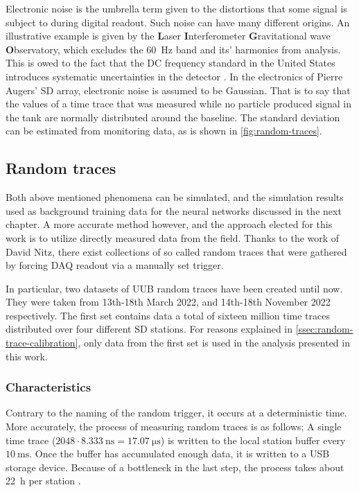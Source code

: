 Electronic noise is the umbrella term given to the distortions that some signal is subject to during digital readout. Such noise can have many different origins.
An illustrative example is given by the \textbf{L}aser \textbf{I}nterferometer \textbf{G}ravitational wave \textbf{O}bservatory, which excludes the \SI{60}{\hertz}
band and its' harmonics from analysis. This is owed to the fact that the DC frequency standard in the United States introduces systematic uncertainties in the
detector \cite{martynov2016sensitivity}. In the electronics of Pierre Augers' SD array, electronic noise is assumed to be Gaussian. That is to say that the 
\SI{}{\ADC} values of a time trace that was measured while no particle produced signal in the tank are normally distributed around the baseline. The standard 
deviation can be estimated from monitoring data, as is shown in \autoref{fig:random-traces}.

\subsection{Random traces}
\label{ssec:random-traces}

Both above mentioned phenomena can be simulated, and the simulation results used as background training data for the neural networks discussed in the next chapter.
A more accurate method however, and the approach elected for this work is to utilize directly measured data from the field. Thanks to the work of David Nitz, there 
exist collections of so called random traces that were gathered by forcing DAQ readout via a manually set trigger. 

In particular, two datasets of UUB random traces have been created until now. They were taken from 13th-18th March 2022, and 14th-18th November 2022 respectively. 
The first set contains data a total of sixteen million time traces distributed over four different SD stations. For reasons explained in 
\autoref{ssec:random-trace-calibration}, only data from the first set is used in the analysis presented in this work.

\subsubsection{Characteristics}
\label{ssec:random-trace-characteristics}

Contrary to the naming of the random trigger, it occurs at a deterministic time. More accurately, the process of measuring random traces is as follows;
A single time trace ($2048\cdot\SI{8.333}{\nano\second} = \SI{17.07}{\micro\second}$) is written to the local station buffer every $\SI{10}{\milli\second}$. Once
the buffer has accumulated enough data, it is written to a USB storage device. Because of a bottleneck in the last step, the process takes about \SI{22}{\hour}
per station \cite{nitzCorrespondence}.

